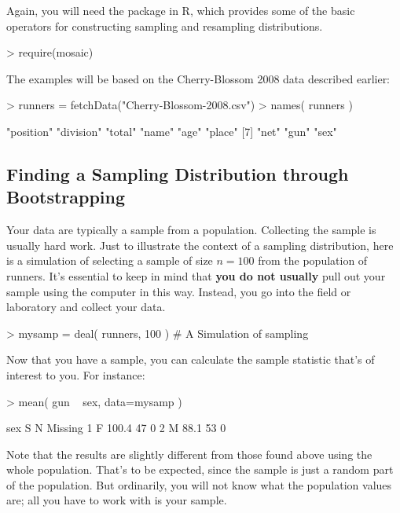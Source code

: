 


Again, you will need the  package in R, which provides
some of the basic operators for constructing sampling and resampling distributions.
\begin{Schunk}
\begin{Sinput}
> require(mosaic)
\end{Sinput}
\end{Schunk}

The examples will be based on 
the Cherry-Blossom 2008 data described earlier: \datasetCherryBlossomEight
\begin{Schunk}
\begin{Sinput}
> runners = fetchData("Cherry-Blossom-2008.csv")
> names( runners )
\end{Sinput}
\begin{Soutput}
[1] "position" "division" "total"    "name"     "age"      "place"   
[7] "net"      "gun"      "sex"     
\end{Soutput}
\end{Schunk}

\subsection{Finding a Sampling Distribution through Bootstrapping}
\label{sec:find-sampling-distribution}

Your data are typically a sample from a population.  Collecting the
sample is usually hard work.  Just to illustrate the context of
a sampling distribution, here is a simulation of selecting a sample of
size $n=100$ from the population of runners.  It's essential to keep
in mind that {\bf you do not usually} pull out your sample using the
computer in this way.  Instead, you go into the field or laboratory and collect your data.
\begin{Schunk}
\begin{Sinput}
> mysamp = deal( runners, 100 ) # A Simulation of sampling
\end{Sinput}
\end{Schunk}

Now that you have a sample, you can calculate the sample statistic
that's of interest to you.  For instance:
\begin{Schunk}
\begin{Sinput}
> mean( gun ~ sex, data=mysamp )
\end{Sinput}
\begin{Soutput}
  sex     S  N Missing
1   F 100.4 47       0
2   M  88.1 53       0
\end{Soutput}
\end{Schunk}
Note that the results are slightly different from those found above
using the whole population.  That's to be expected, since the sample
is just a random part of the population.  But ordinarily, you will not
know what the population values are; all you have to work with is your
sample.  

